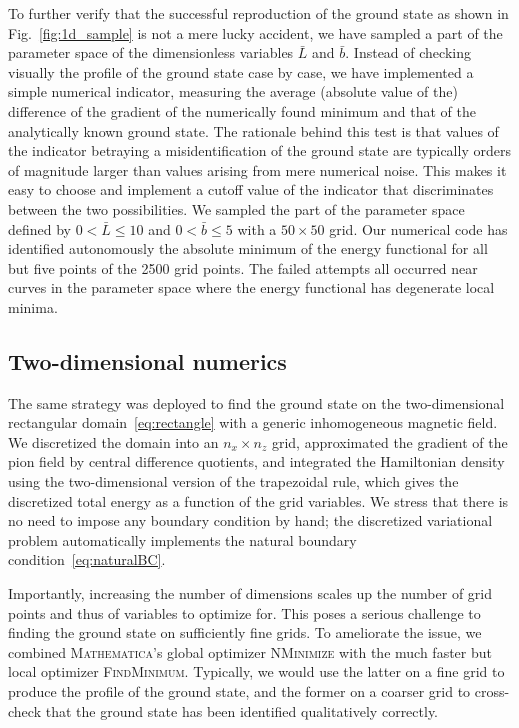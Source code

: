 \documentclass[pdflatex,iicol,sn-mathphys-num]{sn-jnl}
\newcommand{\bmag}{b}%
\begin{document}
To further verify that the successful reproduction of the ground state as shown in Fig.~\ref{fig:1d_sample} is not a mere lucky accident, we have sampled a part of the parameter space of the dimensionless variables $\bar L$ and $\bar\bmag$. Instead of checking visually the profile of the ground state case by case, we have implemented a simple numerical indicator, measuring the average (absolute value of the) difference of the gradient of the numerically found minimum and that of the analytically known ground state. The rationale behind this test is that values of the indicator betraying a misidentification of the ground state are typically orders of magnitude larger than values arising from mere numerical noise. This makes it easy to choose and implement a cutoff value of the indicator that discriminates between the two possibilities. We sampled the part of the parameter space defined by $0<\bar L\leq10$ and $0<\bar\bmag\leq5$ with a $50\times50$ grid. Our numerical code has identified autonomously the absolute minimum of the energy functional for all but five points of the 2500 grid points. The failed attempts all occurred near curves in the parameter space where the energy functional has degenerate local minima.


\subsection{Two-dimensional numerics}
\label{subsec:nonuniformBnonzeroMsample}

The same strategy was deployed to find the ground state on the two-dimensional rectangular domain~\eqref{eq:rectangle} with a generic inhomogeneous magnetic field. We discretized the domain into an $n_x\times n_z$ grid, approximated the gradient of the pion field by central difference quotients, and integrated the Hamiltonian density using the two-dimensional version of the trapezoidal rule, which gives the discretized total energy as a function of the grid variables. We stress that there is no need to impose any boundary condition by hand; the discretized variational problem automatically implements the natural boundary condition~\eqref{eq:naturalBC}.

Importantly, increasing the number of dimensions scales up the number of grid points and thus of variables to optimize for. This poses a serious challenge to finding the ground state on sufficiently fine grids. To ameliorate the issue, we combined \textsc{Mathematica}'s global optimizer \textsc{NMinimize} with the much faster but local optimizer \textsc{FindMinimum}. Typically, we would use the latter on a fine grid to produce the profile of the ground state, and the former on a coarser grid to cross-check that the ground state has been identified qualitatively correctly.
\end{document}
